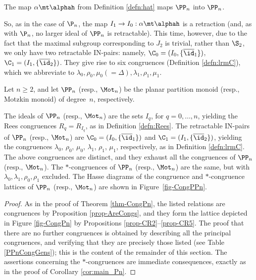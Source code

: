 \begin{corollary}
\label{cor:retract_planar}
The map $\alpha\mt\alphah$ from Definition \ref{defn:hat} maps $\PP_n$ into $\PP_n$. \epfres
\end{corollary}

So, as in the case of $\P_n$, the map $I_1\to I_0:\alpha\mt\alphah$ is a retraction (and, as with $\P_n$, no larger ideal of $\PP_n$ is retractable).
This time, however, due to the fact that the maximal subgroup corresponding to $J_2$ is trivial, rather than $\S_2$, we only have two retractable IN-pairs: namely,
$\C_0=(I_0,\{\overline{\id}_1\})$,
$\C_1=(I_1,\{\overline{\id}_2\})$.
They give rise to six congruences (Definition \ref{defn:lrmC}), which we abbreviate to $\lambda_0,\rho_0,\mu_0(=\Delta),\lambda_1,\rho_1,\mu_1$.

\newpage

\begin{thm}\label{thm-CongPPn}
Let $n\geq2$, and let $\PP_n$ (resp., $\Mot_n$) be the planar partition monoid (resp., Motzkin monoid) of degree~$n$, respectively.  
\begin{itemize}
 The ideals of $\PP_n$ (resp., $\Mot_n$) are the sets $I_q$, for $q=0,\ldots,n$, yielding the Rees congruences $R_q=R_{I_q}$, as in Definition \ref{defn:Rees}.
 The retractable IN-pairs of $\PP_n$ (resp., $\Mot_n$) are $\C_0=(I_0,\{\overline{\id}_1\})$ and $\C_1=(I_1,\{\overline{\id}_2\})$, yielding the congruences $\lambda_0$, $\rho_0$, $\mu_0$, $\lambda_1$, $\rho_1$, $\mu_1$, respectively, as in Definition \ref{defn:lrmC}.
 The above congruences are distinct, and they exhaust all the congruences of $\PP_n$ (resp., $\Mot_n$).
 The $\ast$-congruences of $\PP_n$ (resp., $\Mot_n$) are the same, but with $\lambda_0,\lambda_1,\rho_0,\rho_1$ excluded.
 The Hasse diagrams of the congruence and $*$-congruence lattices of $\PP_n$ (resp., $\Mot_n$) are shown in Figure~\ref{fig-CongPPn}.
\end{itemize}
\end{thm}

\begin{proof}
As in the proof of Theorem \ref{thm-CongPn}, the
listed relations are congruences by Proposition \ref{prop-AreCongs}, and they form the lattice depicted in Figure \ref{fig-CongPn} by Propositions \ref{prop-CR2}--\ref{prop-CR5}.
The proof that there are no further congruences is obtained by describing all the principal congruences, and verifying that they are precisely those listed (see Table \ref{PPnCongGens}); 
this is the content of the remainder of this section. 
The assertions concerning the $\ast$-congruences are immediate consequences, exactly as in the proof of Corollary \ref{cor:main_Pn}.
\end{proof}



